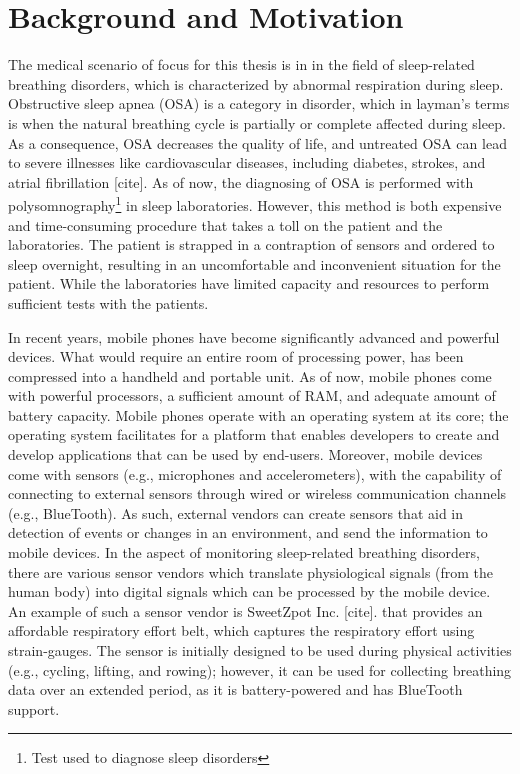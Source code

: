 \section{Background and Motivation}

The medical scenario of focus for this thesis is in in the field of sleep-related breathing disorders, which is characterized by abnormal respiration during sleep. Obstructive sleep apnea (OSA) is a category in disorder, which in layman's terms is when the natural breathing cycle is partially or complete affected during sleep. As a consequence, OSA decreases the quality of life, and untreated OSA can lead to severe illnesses like cardiovascular diseases, including diabetes, strokes, and atrial fibrillation [cite]. As of now, the diagnosing of OSA is performed with polysomnography\footnote{Test used to diagnose sleep disorders} in sleep laboratories. However, this method is both expensive and time-consuming procedure that takes a toll on the patient and the laboratories. The patient is strapped in a contraption of sensors and ordered to sleep overnight, resulting in an uncomfortable and inconvenient situation for the patient. While the laboratories have limited capacity and resources to perform sufficient tests with the patients.

In recent years, mobile phones have become significantly advanced and powerful devices. What would require an entire room of processing power, has been compressed into a handheld and portable unit. As of now, mobile phones come with powerful processors, a sufficient amount of RAM, and adequate amount of battery capacity. Mobile phones operate with an operating system at its core; the operating system facilitates for a platform that enables developers to create and develop applications that can be used by end-users. Moreover, mobile devices come with sensors (e.g., microphones and accelerometers), with the capability of connecting to external sensors through wired or wireless communication channels (e.g., BlueTooth). As such, external vendors can create sensors that aid in detection of events or changes in an environment, and send the information to mobile devices. In the aspect of monitoring sleep-related breathing disorders, there are various sensor vendors which translate physiological signals (from the human body) into digital signals which can be processed by the mobile device. An example of such a sensor vendor is SweetZpot Inc. [cite]. that provides an affordable respiratory effort belt, which captures the respiratory effort using strain-gauges. The sensor is initially designed to be used during physical activities (e.g., cycling, lifting, and rowing); however, it can be used for collecting breathing data over an extended period, as it is battery-powered and has BlueTooth support.

